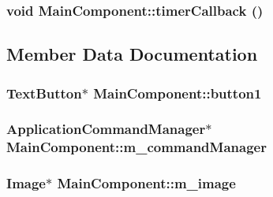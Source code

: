 \begin{CompactItemize}
{\subsubsection[{timerCallback}]{\setlength{\rightskip}{0pt plus 5cm}void MainComponent::timerCallback ()}}
\label{class_main_component_f5189d8f0352afb781ba57404b732edb}




\subsection{Member Data Documentation}
\hypertarget{class_main_component_b5d3edf82637368286e4a3785e8ebe2a}{
\subsubsection[{button1}]{\setlength{\rightskip}{0pt plus 5cm}TextButton$\ast$ {\bf MainComponent::button1}}}
\label{class_main_component_b5d3edf82637368286e4a3785e8ebe2a}


\hypertarget{class_main_component_a86edd452d1fcbf0528180809f26aefe}{
\subsubsection[{m\_\-commandManager}]{\setlength{\rightskip}{0pt plus 5cm}ApplicationCommandManager$\ast$ {\bf MainComponent::m\_\-commandManager}}}
\label{class_main_component_a86edd452d1fcbf0528180809f26aefe}


\hypertarget{class_main_component_2119cdf409e57b888e15b41f3b43e70b}{
\subsubsection[{m\_\-image}]{\setlength{\rightskip}{0pt plus 5cm}Image$\ast$ {\bf MainComponent::m\_\-image}}}
\label{class_main_component_2119cdf409e57b888e15b41f3b43e70b}



\end{CompactItemize}
